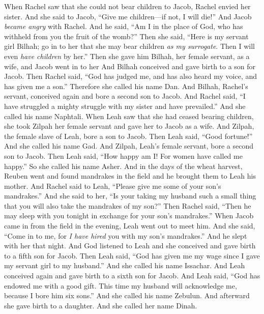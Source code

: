 \begin{biblechapter} %
 When Rachel saw that she could not bear children to Jacob, Rachel envied her sister. And she said to Jacob, “Give me children—if not, I will die!”
\verse And Jacob \textit{became angry} with Rachel. And he said, “Am I in the place of God, who has withheld from you the fruit of the womb?”
\verse Then she said, “Here is my servant girl Bilhah; go in to her that she may bear children \textit{as my surrogate}. Then I will even \textit{have children} by her.”
\verse Then she gave him Bilhah, her female servant, as a wife, and Jacob went in to her
\verse And Bilhah conceived and gave birth to a son for Jacob.
\verse Then Rachel said, “God has judged me, and has also heard my voice, and has given me a son.” Therefore she called his name Dan.
\verse And Bilhah, Rachel’s servant, conceived again and bore a second son to Jacob.
\verse And Rachel said, “I have struggled a mighty struggle with my sister and have prevailed.” And she called his name Naphtali.
\verse When Leah saw that she had ceased bearing children, she took Zilpah her female servant and gave her to Jacob as a wife.
\verse And Zilpah, the female slave of Leah, bore a son to Jacob.
\verse Then Leah said, “Good fortune!” And she called his name Gad.
\verse And Zilpah, Leah’s female servant, bore a second son to Jacob.
\verse Then Leah said, “How happy am I! For women have called me happy.” So she called his name Asher.
\verse And in the days of the wheat harvest, Reuben went and found mandrakes in the field and he brought them to Leah his mother. And Rachel said to Leah, “Please give me some of your son’s mandrakes.”
\verse And she said to her, “Is your taking my husband such a small thing that you will also take the mandrakes of my son?” Then Rachel said, “Then he may sleep with you tonight in exchange for your son’s mandrakes.”
\verse When Jacob came in from the field in the evening, Leah went out to meet him. And she said, “Come in to me, for \textit{I have hired} you with my son’s mandrakes.” And he slept with her that night.
\verse And God listened to Leah and she conceived and gave birth to a fifth son for Jacob.
\verse Then Leah said, “God has given me my wage since I gave my servant girl to my husband.” And she called his name Issachar.
\verse And Leah conceived again and gave birth to a sixth son for Jacob.
\verse And Leah said, “God has endowed me with a good gift. This time my husband will acknowledge me, because I bore him six sons.” And she called his name Zebulun.
\verse And afterward she gave birth to a daughter. And she called her name Dinah.

\end{biblechapter}
